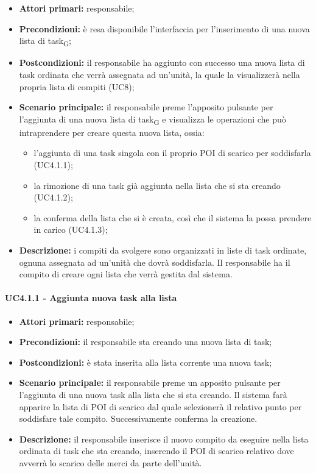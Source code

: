 \begin{itemize}
	\item 	\textbf{Attori primari:} responsabile;
	\item 	\textbf{Precondizioni:} è resa disponibile l'interfaccia per l'inserimento di una nuova lista di task\textsubscript{G}; 
	\item 	\textbf{Postcondizioni:} il responsabile ha aggiunto con successo una nuova lista di task ordinata che verrà assegnata ad un'unità, la quale la visualizzerà nella propria lista di compiti (UC8);
	\item 	\textbf{Scenario principale:} il responsabile preme l'apposito pulsante per l'aggiunta di una nuova lista di task\textsubscript{G} e visualizza le operazioni che può intraprendere per creare questa nuova lista, ossia:
	\begin{itemize}
		\item l'aggiunta di una task singola con il proprio POI di scarico per soddisfarla (UC4.1.1);
		\item la rimozione di una task già aggiunta nella lista che si sta creando (UC4.1.2);
		\item la conferma della lista che si è creata, così che il sistema la possa prendere in carico (UC4.1.3);
	\end{itemize}
	\item 	\textbf{Descrizione:} i compiti da svolgere sono organizzati in liste di task ordinate, ognuna assegnata ad un'unità che dovrà soddisfarla. Il responsabile ha il compito di creare ogni lista che verrà gestita dal sistema.
\end{itemize}

\paragraph{UC4.1.1 - Aggiunta nuova task alla lista}
\begin{itemize}
	\item 	\textbf{Attori primari:} responsabile;
	\item 	\textbf{Precondizioni:} il responsabile sta creando una nuova lista di task;
	\item 	\textbf{Postcondizioni:} è stata inserita alla lista corrente una nuova task;
	\item 	\textbf{Scenario principale:} il responsabile preme un apposito pulsante per l'aggiunta di una nuova task alla lista che si sta creando. Il sistema farà apparire la lista di POI di scarico dal quale selezionerà il relativo punto per soddisfare tale compito. Successivamente conferma la creazione.
	\item 	\textbf{Descrizione:} il responsabile inserisce il nuovo compito da eseguire nella lista ordinata di task che sta creando, inserendo il POI di scarico relativo dove avverrà lo scarico delle merci da parte dell'unità.
	
\end{itemize}

